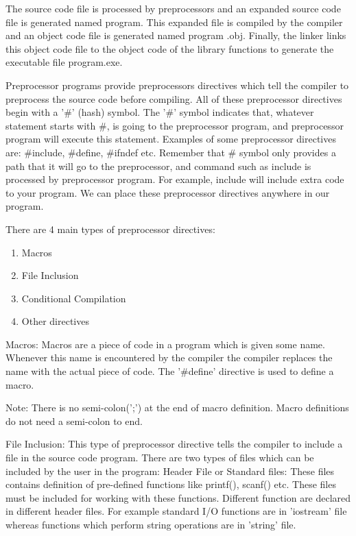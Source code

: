 \documentclass[12pt, a4paper]{article}
\begin{document}
    The source code file is processed by preprocessors and an expanded source code file is generated named program. This expanded file is compiled by the compiler and an object code file is generated named program .obj. Finally, the linker links this object code file to the object code of the library functions to generate the executable file program.exe.

    \par Preprocessor programs provide preprocessors directives which tell the compiler to preprocess the source code before compiling. All of these preprocessor directives begin with a '\#' (hash) symbol. The '\#' symbol indicates that, whatever statement starts with \#, is going to the preprocessor program, and preprocessor program will execute this statement. Examples of some preprocessor directives are: \#include, \#define, \#ifndef etc. Remember that \# symbol only provides a path that it will go to the preprocessor, and command such as include is processed by preprocessor program. For example, include will include extra code to your program. We can place these preprocessor directives anywhere in our program. 

    There are 4 main types of preprocessor directives: 
    \begin{enumerate}
        \item Macros
        \item File Inclusion
        \item Conditional Compilation
        \item Other directives
    \end{enumerate} 
    
    Macros: Macros are a piece of code in a program which is given some name. Whenever this name is encountered by the compiler the compiler replaces the name with the actual piece of code. The '\#define' directive is used to define a macro. 

    \begin{highlight}
        Note: There is no semi-colon(';') at the end of macro definition. Macro definitions do not need a semi-colon to end.
    \end{highlight}


    File Inclusion: This type of preprocessor directive tells the compiler to include a file in the source code program. There are two types of files which can be included by the user in the program: 
        Header File or Standard files: These files contains definition of pre-defined functions like printf(), scanf() etc. These files must be included for working with these functions. Different function are declared in different header files. For example standard I/O functions are in 'iostream' file whereas functions which perform string operations are in 'string' file.
        
\end{document}
